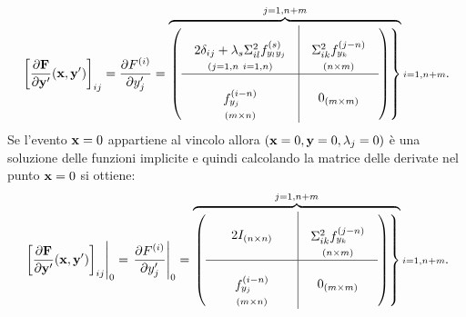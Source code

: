 \begin{equation}
\label{dfdyprime}
\left[\frac{\partial{\bf F}}{\partial{\bf y}^\prime}({\bf x},{\bf y}^\prime)\right]_{ij}=\frac{\partial F^{(i)}}{\partial y^\prime_j}=\overbrace{\left.\left(\begin{array}{c|c}\mbox{$\begin{array}{c} \\2\delta_{ij}+\lambda_s\Sigma^2_{il}f^{(s)}_{y_ly_j}\\{\scriptstyle (j=1,n\ i=1,n)} \end{array}$}&\mbox{$\begin{array}{c} \\ \Sigma^2_{ik}f^{(j-n)}_{y_k}\\{\scriptstyle (n\times m)}\end{array}$}\\ \hline\mbox{$\begin{array}{c} \\f^{(i-n)}_{y_j}\\{\scriptstyle (m\times n)}\end{array}$}&0_{(m\times m)}\end{array}\right)\right\}}^{j=1,n+m}{\scriptstyle i=1,n+m}.
\end{equation}
Se l'evento ${\bf x}=0$ appartiene al vincolo allora $({\bf x}=0,{\bf y}=0,\lambda_j=0)$
\`e una soluzione delle funzioni implicite e quindi calcolando la matrice delle
derivate nel punto ${\bf x}=0$ si ottiene:
\begin{equation}
\label{dfdyprime0}
\left.\left[\frac{\partial{\bf F}}{\partial{\bf y}^\prime}({\bf x},{\bf y}^\prime)\right]_{ij}\right|_0=\left.\frac{\partial F^{(i)}}{\partial y^\prime_j}\right|_0=\overbrace{\left.\left(\begin{array}{c|c}\mbox{$\begin{array}{ccc} & & \\ & 2I_{(n\times n)} & \\& &  \end{array}$}&\mbox{$\begin{array}{c}\\ \Sigma^2_{ik}f^{(j-n)}_{y_k}\\{\scriptstyle (n\times m)}\end{array}$}\\ \hline \mbox{$\begin{array}{c} \\f^{(i-n)}_{y_j}\\{\scriptstyle (m\times n)}\end{array}$}&0_{(m\times m)}\end{array}\right)\right\}}^{j=1,n+m}{\scriptstyle i=1,n+m}.
\end{equation}

